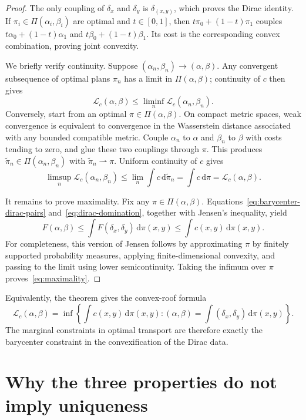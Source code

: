\documentclass[11pt]{article}
\theoremstyle{definition}
\theoremstyle{remark}
\newcommand{\Lc}{\mathcal L_c}
\newcommand{\PiC}{\Pi}
\newcommand{\dd}{\,\mathrm d}
\begin{document}
\begin{proof}
The only coupling of $\delta_x$ and $\delta_y$ is
$\delta_{(x,y)}$, which proves the Dirac identity. If
$\pi_i\in\PiC(\alpha_i,\beta_i)$ are optimal and $t\in[0,1]$, then
$t\pi_0+(1-t)\pi_1$ couples
$t\alpha_0+(1-t)\alpha_1$ and $t\beta_0+(1-t)\beta_1$.
Its cost is the corresponding convex combination, proving joint convexity.

We briefly verify continuity. Suppose
$(\alpha_n,\beta_n)\to(\alpha,\beta)$. Any convergent subsequence of optimal
plans $\pi_n$ has a limit in $\PiC(\alpha,\beta)$; continuity of $c$ then gives
\[
  \Lc(\alpha,\beta)
  \leq \liminf_n \Lc(\alpha_n,\beta_n).
\]
Conversely, start from an optimal $\pi\in\PiC(\alpha,\beta)$. On compact metric
spaces, weak convergence is equivalent to convergence in the Wasserstein
distance associated with any bounded compatible metric. Couple $\alpha_n$ to
$\alpha$ and $\beta_n$ to $\beta$ with costs tending to zero, and glue these
two couplings through $\pi$. This produces
$\widetilde\pi_n\in\PiC(\alpha_n,\beta_n)$ with
$\widetilde\pi_n\rightharpoonup\pi$. Uniform continuity of $c$ gives
\[
  \limsup_n\Lc(\alpha_n,\beta_n)
  \leq\lim_n\int c\dd\widetilde\pi_n
  =\int c\dd\pi
  =\Lc(\alpha,\beta).
\]

It remains to prove maximality. Fix any $\pi\in\PiC(\alpha,\beta)$.
Equations~\eqref{eq:barycenter-dirac-pairs} and~\eqref{eq:dirac-domination},
together with Jensen's inequality, yield
\[
  F(\alpha,\beta)
  \leq
  \int F(\delta_x,\delta_y)\dd\pi(x,y)
  \leq
  \int c(x,y)\dd\pi(x,y).
\]
For completeness, this version of Jensen follows by approximating $\pi$ by
finitely supported probability measures, applying finite-dimensional
convexity, and passing to the limit using lower semicontinuity. Taking the
infimum over $\pi$ proves~\eqref{eq:maximality}.
\end{proof}

Equivalently, the theorem gives the convex-roof formula
\begin{equation}\label{eq:convex-roof}
  \Lc(\alpha,\beta)
  =
  \inf\left\{
    \int c(x,y)\dd\pi(x,y):
    (\alpha,\beta)=\int(\delta_x,\delta_y)\dd\pi(x,y)
  \right\}.
\end{equation}
The marginal constraints in optimal transport are therefore exactly the
barycenter constraint in the convexification of the Dirac data.

\section{Why the three properties do not imply uniqueness}
\end{document}

